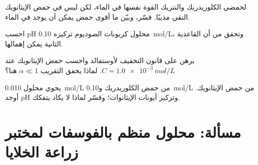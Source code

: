 \begin{exercise}[$\star\star$]\label{exo:b1:predominant-reaction:9}
لحمضي الكلوريدريك والنتريك القوة نفسها في الماء، لكن ليس في
حمض الإيثانويك النقي مذيبًا. فسّر، وبيّن ما أقوى حمض
يمكن أن يوجد في الماء.
\end{exercise}

\begin{exercise}[$\star\star\star$]\label{exo:b1:predominant-reaction:10}
احسب pH محلول كربونات الصوديوم تركيزه \qty{0.10}{mol/L}،
وتحقق من أن القاعدية الثانية يمكن إهمالها.
\end{exercise}

\begin{exercise}[$\star\star\star$]\label{exo:b1:predominant-reaction:11}
برهن على قانون التخفيف لأوستفالد واحسب 
حمض الإيثانويك عند $C = \qty{1.0e-3}{mol/L}$. لماذا يخفق
التقريب $\alpha \ll 1$ هنا؟
\end{exercise}

\begin{exercise}[$\star\star\star$]\label{exo:b1:predominant-reaction:12}
يحوي محلول \qty{0.010}{mol/L} من حمض الكلوريدريك
و\qty{0.10}{mol/L} من حمض الإيثانويك. أوجد pH وتركيز
أيونات الإيثانوات؛ وفسّر لماذا لا يكاد  يتفكك.
\end{exercise}

\section{مسألة: محلول منظم بالفوسفات لمختبر زراعة الخلايا}

